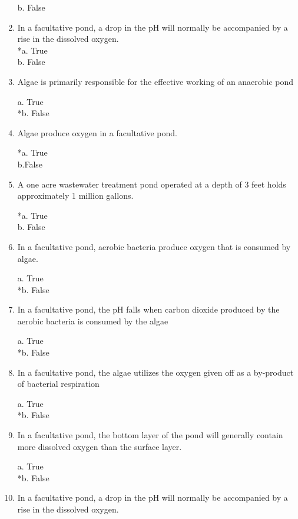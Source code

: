 \begin{enumerate}
b. False \\


\item  In a facultative pond, a drop in the pH will normally be accompanied by a rise in the dissolved oxygen.\\


*a. True \\

b. False \\


\item  Algae is primarily responsible for the effective working of an anaerobic pond 

a. True \\
*b. False 


\item  Algae produce oxygen in a facultative pond. 

*a. True\\
b.False 


\item  A one acre wastewater treatment pond operated at a depth of 3 feet holds approximately 1 million gallons. 

*a. True \\
b. False 


\item  In a facultative pond, aerobic bacteria produce oxygen that is consumed by algae. 

a. True \\
*b. False 


\item  In a facultative pond, the pH falls when carbon dioxide produced by the aerobic bacteria is consumed by the algae 

a. True \\
*b. False 


\item  In a facultative pond, the algae utilizes the oxygen given off as a by-product of bacterial respiration 

a. True \\
*b. False 


\item  In a facultative pond, the bottom layer of the pond will generally contain more dissolved oxygen than the surface layer. 

a. True \\
*b. False 


\item  In a facultative pond, a drop in the pH will normally be accompanied by a rise in the dissolved oxygen. 


\end{enumerate}
